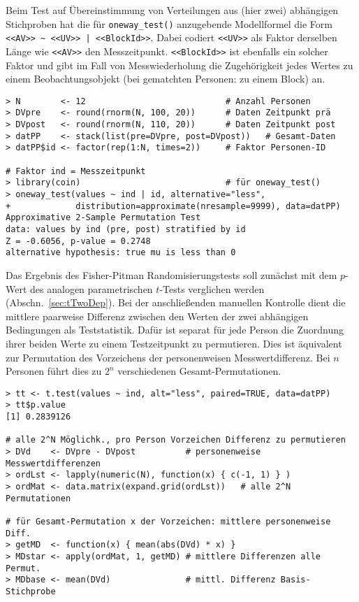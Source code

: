 Beim Test auf Übereinstimmung von Verteilungen aus (hier zwei) abhängigen Stichproben hat die für \lstinline!oneway_test()! anzugebende Modellformel die Form \lstinline!<<AV>> ~ <<UV>> | <<BlockId>>!. Dabei codiert \lstinline!<<UV>>! als Faktor derselben Länge wie \lstinline!<<AV>>! den Messzeitpunkt. \lstinline!<<BlockId>>! ist ebenfalls ein solcher Faktor und gibt im Fall von Messwiederholung die Zugehörigkeit jedes Wertes zu einem Beobachtungsobjekt (bei gematchten Personen: zu einem Block) an.
\begin{lstlisting}
> N        <- 12                            # Anzahl Personen
> DVpre    <- round(rnorm(N, 100, 20))      # Daten Zeitpunkt prä
> DVpost   <- round(rnorm(N, 110, 20))      # Daten Zeitpunkt post
> datPP    <- stack(list(pre=DVpre, post=DVpost))   # Gesamt-Daten
> datPP$id <- factor(rep(1:N, times=2))     # Faktor Personen-ID

# Faktor ind = Messzeitpunkt
> library(coin)                             # für oneway_test()
> oneway_test(values ~ ind | id, alternative="less",
+             distribution=approximate(nresample=9999), data=datPP)
Approximative 2-Sample Permutation Test
data: values by ind (pre, post) stratified by id
Z = -0.6056, p-value = 0.2748
alternative hypothesis: true mu is less than 0
\end{lstlisting}

Das Ergebnis des Fisher-Pitman Randomisierungstests soll zunächst mit dem $p$-Wert des analogen parametrischen $t$-Tests verglichen werden (Abschn.\ \ref{sec:tTwoDep}). Bei der anschließenden manuellen Kontrolle dient die mittlere paarweise Differenz zwischen den Werten der zwei abhängigen Bedingungen als Teststatistik. Dafür ist separat für jede Person die Zuordnung ihrer beiden Werte zu einem Testzeitpunkt zu permutieren. Dies ist äquivalent zur Permutation des Vorzeichens der personenweisen Messwertdifferenz. Bei $n$ Personen führt dies zu $2^{n}$ verschiedenen Gesamt-Permutationen.
\begin{lstlisting}
> tt <- t.test(values ~ ind, alt="less", paired=TRUE, data=datPP)
> tt$p.value
[1] 0.2839126

# alle 2^N Möglichk., pro Person Vorzeichen Differenz zu permutieren
> DVd    <- DVpre - DVpost          # personenweise Messwertdifferenzen
> ordLst <- lapply(numeric(N), function(x) { c(-1, 1) } )
> ordMat <- data.matrix(expand.grid(ordLst))   # alle 2^N Permutationen

# für Gesamt-Permutation x der Vorzeichen: mittlere personenweise Diff.
> getMD  <- function(x) { mean(abs(DVd) * x) }
> MDstar <- apply(ordMat, 1, getMD) # mittlere Differenzen alle Permut.
> MDbase <- mean(DVd)               # mittl. Differenz Basis-Stichprobe
\end{lstlisting}

